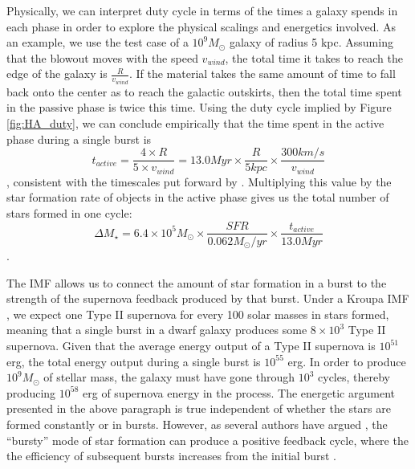 \documentclass[iop]{emulateapj}
\begin{document}
Physically, we can interpret duty cycle in terms of the times a galaxy spends in each phase in order to explore the physical scalings and energetics involved. As an example, we use the test case of a $10^9 M_{\odot}$ galaxy of radius 5 kpc. Assuming that the blowout moves with the speed $v_{wind}$, the total time it takes to reach the edge of the galaxy is $\frac{R}{v_{wind}}$. If the material takes the same amount of time to fall back onto the center as to reach the galactic outskirts, then the total time spent in the passive phase is twice this time. Using the duty cycle implied by Figure \ref{fig:HA_duty}, we can conclude empirically that the time spent in the active phase during a single burst is $$t_{active} = \frac{4 \times R}{5 \times v_{wind}} = 13.0 Myr \times \frac{R}{5 kpc}\times \frac{300 km/s}{v_{wind}}  $$, consistent with the timescales put forward by \cite{EB17}. Multiplying this value by the star formation rate of objects in the active phase gives us the total number of stars formed in one cycle:
$$\Delta M_{\star} = 6.4 \times 10^5 M_{\odot} \times \frac{SFR}{0.062 M_{\odot}/yr} \times \frac{t_{active}}{13.0 Myr}$$.

The IMF allows us to connect the amount of star formation in a burst to the strength of the supernova feedback produced by that burst. Under a Kroupa IMF \citep{Kroupa02}, we expect one Type II supernova for every 100 solar masses in stars formed, meaning that a single burst in a dwarf galaxy produces some $8 \times 10^3$ Type II supernova. Given that the average energy output of a Type II supernova is $10^{51}$ erg, the total energy output during a single burst is $10^{55}$ erg. In order to produce $10^9 M_{\odot}$ of stellar mass, the galaxy must have gone through $10^3$ cycles, thereby producing $10^{58}$ erg of supernova energy in the process. The energetic argument presented in the above paragraph is true independent of whether the stars are formed constantly or in bursts. However, as several authors have argued \citep{Governato12,GK13}, the ``bursty'' mode of star formation can produce a positive feedback cycle, where the the efficiency of subsequent bursts increases from the initial burst \cite[see][]{Pontzen12,Governato12}. 

\end{document}
